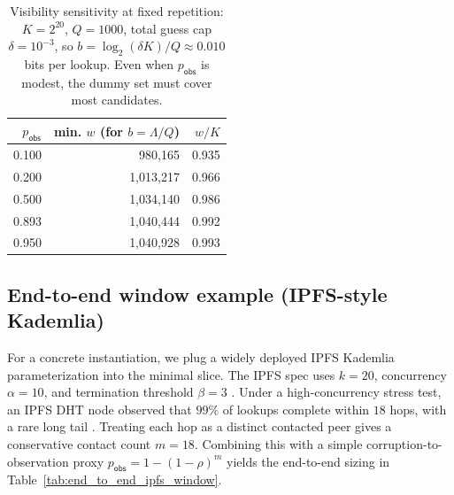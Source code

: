 \documentclass[11pt]{article}
\begin{document}
\begin{table}[t]
\centering
\caption{Visibility sensitivity at fixed repetition: $K=2^{20}$, $Q=1000$, total guess cap $\delta=10^{-3}$, so $b=\log_2(\delta K)/Q\approx0.010$ bits per lookup. Even when $p_{\mathsf{obs}}$ is modest, the dummy set must cover most candidates.}
\label{tab:pobs-sweep}
\begin{tabular}{r r r}
\toprule
$p_{\mathsf{obs}}$ & min. $w$ (for $b=\Lambda/Q$) & $w/K$ \\
\midrule
0.100 & 980,165 & 0.935 \\
0.200 & 1,013,217 & 0.966 \\
0.500 & 1,034,140 & 0.986 \\
0.893 & 1,040,444 & 0.992 \\
0.950 & 1,040,928 & 0.993 \\
\bottomrule
\end{tabular}
\end{table}


\subsection{End-to-end window example (IPFS-style Kademlia)}\label{sec:endtoend}
For a concrete instantiation, we plug a widely deployed IPFS Kademlia parameterization into the minimal slice. The IPFS spec uses $k{=}20$, concurrency $\alpha{=}10$, and termination threshold $\beta{=}3$ \cite{ipfs_kad_spec}. Under a high-concurrency stress test, an IPFS DHT node observed that $99\%$ of lookups complete within $18$ hops, with a rare long tail \cite{cortes2024kadlimits}. Treating each hop as a distinct contacted peer gives a conservative contact count $m=18$. Combining this with a simple corruption-to-observation proxy $p_{\mathsf{obs}}=1-(1-\rho)^m$ yields the end-to-end sizing in Table~\ref{tab:end_to_end_ipfs_window}.
\end{document}
